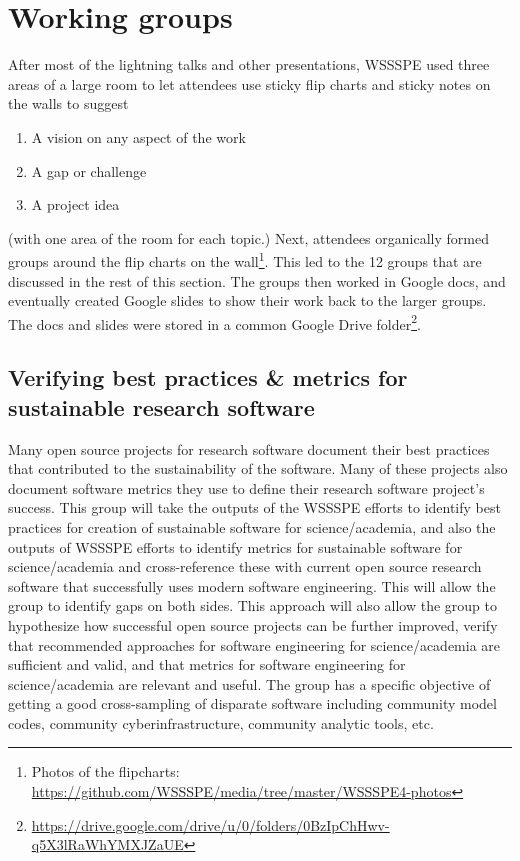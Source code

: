 \documentclass[11pt, oneside]{amsart}
\newcommand{\todo}[1]{{\color{blue}$\blacksquare$~\textsf{[TODO: #1]}}}
\newcommand{\note}[1]{ {\textcolor{blueish}    { ***Note:      #1 }}}
\begin{document}
\section{Working groups} \label{sec:WGs}

After most of the lightning talks and other presentations, WSSSPE used three areas of a large room to let
attendees use sticky flip charts and sticky notes on the walls to suggest
\begin{enumerate}
\item A vision on any aspect of the work
\item A gap or challenge
\item A project idea
\end{enumerate}
(with one area of the room for each topic.)
%
Next, attendees organically formed groups around the flip charts on the wall\footnote{Photos of the flipcharts: \url{https://github.com/WSSSPE/media/tree/master/WSSSPE4-photos}}.  This led to the 12 groups that are discussed in the rest of this section.
The groups then worked in Google docs, and eventually created Google slides to show their work back to the larger groups. The docs and slides were stored in a common Google Drive folder\footnote{\url{https://drive.google.com/drive/u/0/folders/0BzIpChHwv-q5X3lRaWhYMXJZaUE}}. 



\subsection{Verifying best practices \& metrics for sustainable research software}
\label{sec:best-practices-sustainable}


Many open source projects for research software document their best practices that
contributed to the sustainability of the software.  Many of these projects also
document software metrics they use to define their research software project's success.
%
This group will take the outputs of the WSSSPE efforts to identify best practices for creation of sustainable software for science/academia, and also the outputs of WSSSPE efforts to identify metrics for sustainable software for science/academia and cross-reference these with current open source research software that successfully uses modern software engineering.  This will allow the group to identify gaps on both sides.  This approach will also allow the group to hypothesize how successful open source projects can be further improved, verify that recommended approaches for software engineering for science/academia are sufficient and valid, and that metrics for software engineering for science/academia are relevant and useful.  The group has a specific objective of getting a good cross-sampling of disparate software including community model codes, community cyberinfrastructure, community analytic tools, etc.
\end{document}
